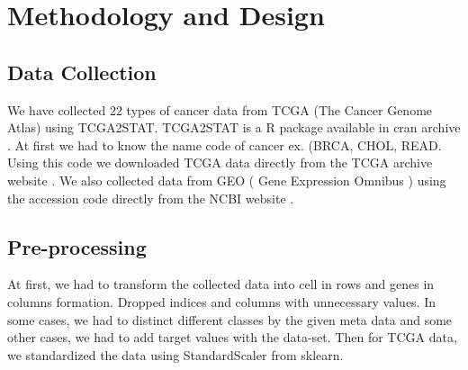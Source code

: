 \section{Methodology and Design}
\label{Meth_des}
\subsection{Data Collection}
We have collected 22 types of cancer data from TCGA (The Cancer Genome Atlas) using TCGA2STAT. TCGA2STAT is a R package available in cran archive \cite{tcga}. At first we had to know the name code of cancer ex. (BRCA, CHOL, READ. Using this code we downloaded TCGA  data directly from the TCGA archive website \cite{GDC}. We also collected data from GEO ( Gene Expression Omnibus ) using the accession code directly from the NCBI website \cite{GEO}. 
\subsection{Pre-processing}
At first, we had to transform the collected data into cell in rows and genes in columns formation. Dropped indices and columns with unnecessary values. In some cases, we had to distinct different classes by the given meta data and some other cases, we had to add target values with the data-set. Then for TCGA data, we standardized the data using StandardScaler from sklearn. 
